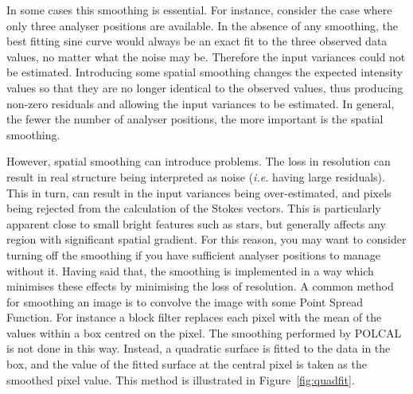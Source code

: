 \documentclass[twoside,11pt]{article}
\newcommand{\latex}[1]{#1}
\newcommand{\html}[1]{}
\renewcommand{\_}{\texttt{\symbol{95}}}
\begin{document}
\begin{enumerate}
In some cases this smoothing is essential. For instance, consider the
case where only three analyser positions are available. In the absence of 
any smoothing, the best fitting sine curve would always be an exact fit 
to the three observed data values, no matter what the noise may be. Therefore 
the input variances could not be estimated. Introducing some spatial
smoothing changes the expected intensity values so that they are no
longer identical to the observed values, thus producing non-zero
residuals and allowing the input variances to be estimated. In general,
the fewer the number of analyser positions, the more important is the 
spatial smoothing.

However, spatial smoothing can introduce problems. The loss in resolution
can result in real structure being interpreted as noise (\emph{i.e.}
having large residuals). This in turn, can result in the input variances
being over-estimated, and pixels being rejected from the calculation of
the Stokes vectors. This is particularly apparent close to small bright
features such as stars, but generally affects any region with significant
spatial gradient. For this reason, you may want to consider turning off
the smoothing if you have sufficient analyser positions to manage without
it. Having said that, the smoothing is implemented in a way which
minimises these effects by minimising the loss of resolution. A common
method for smoothing an image is to convolve the image with some Point
Spread Function. For instance a block filter replaces each pixel with the
mean of the values within a box centred on the pixel. The smoothing
performed by POLCAL is not done in this way. Instead, a quadratic surface
is fitted to the data in the box, and the value of the fitted surface at
the central pixel is taken as the smoothed pixel value. This method is
illustrated in \latex{Figure~\ref{fig:quadfit}.} \html{the next figure:}


\end{enumerate}
\end{document}
